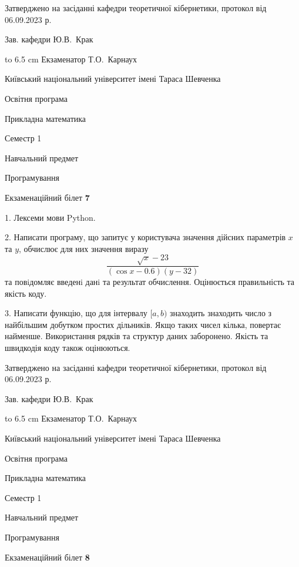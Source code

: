 \documentclass[12pt, ukrainian]{article}
\begin{document}
{\smallskip\smallskip \begin {scriptsize} Затверджено на засіданні кафедри теоретичної кібернетики, протокол   від   06.09.2023 р.\par\smallskip\smallskip\smallskip\smallskip
{\parbox {6.5 cm} {Зав. кафедри \dotfill Ю.В.~Крак}}\hspace {0.7cm} {\hbox to 6.5 cm { Екзаменатор \dotfill Т.О.~Карнаух}} \end{scriptsize}}
\newpage
{{\begin {scriptsize}\par
{ \center  Київський національний університет імені Тараса Шевченка \par}
{\parbox {5 cm}{Освітня програма \hfill}{\parbox {7 cm}{Прикладна математика\hfill}}\parbox {6 cm}{\hfill Семестр 1}}\par
{\parbox {5 cm} {Навчальний предмет \hfill}\parbox {7 cm}{Програмування \hfill}\parbox {6cm}{\hfill}\par}\vspace{-15pt} \end{scriptsize}}{\center Екзаменаційний білет \No \textbf { 7 }\par}}
{%
1. Лексеми мови Python.%
\par
2. Написати програму, що запитує у користувача значення дійсних параметрів $x$ та $y$, обчислює для них значення виразу 
$$\frac{\sqrt x - 23}{(\cos x - 0.6) (y - 32)}$$ 
та повiдомляє введенi данi та результат обчислення.
 Оцінюється правильність та якість коду.

\par
3. Написати функцію, що для інтервалу $[a, b)$ знаходить знаходить число з найбільшим добутком простих дільників. Якщо таких чисел кілька, повертає найменше.  Використання рядків та структур даних заборонено. Якість та швидкодія коду також оцінюються. 

}
{\smallskip\smallskip \begin {scriptsize} Затверджено на засіданні кафедри теоретичної кібернетики, протокол   від   06.09.2023 р.\par\smallskip\smallskip\smallskip\smallskip
{\parbox {6.5 cm} {Зав. кафедри \dotfill Ю.В.~Крак}}\hspace {0.7cm} {\hbox to 6.5 cm { Екзаменатор \dotfill Т.О.~Карнаух}} \end{scriptsize}}
\vspace{0.9cm}
{{\begin {scriptsize}\par
{ \center  Київський національний університет імені Тараса Шевченка \par}
{\parbox {5 cm}{Освітня програма \hfill}{\parbox {7 cm}{Прикладна математика\hfill}}\parbox {6 cm}{\hfill Семестр 1}}\par
{\parbox {5 cm} {Навчальний предмет \hfill}\parbox {7 cm}{Програмування \hfill}\parbox {6cm}{\hfill}\par}\vspace{-15pt} \end{scriptsize}}{\center Екзаменаційний білет \No \textbf { 8 }\par}}
\end{document}
